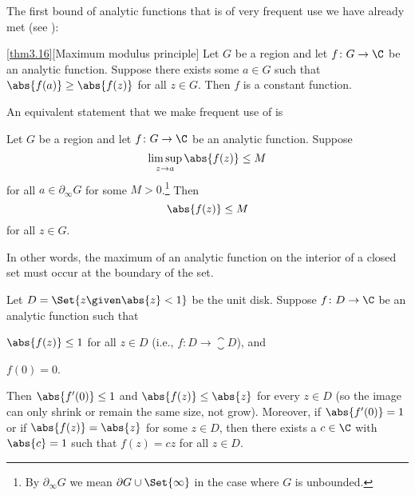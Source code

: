 


The first bound of analytic functions that is of very frequent use we have already met (see ):

\begin{manualtheorem}{\ref{thm3.16}}[Maximum modulus principle]\label{thm6.1}
	Let $G$ be a region and let $f \colon G \to \C$ be an analytic function.
	Suppose there exists some $a \in G$ such that $\abs{f(a)} \geq \abs{f(z)}$ for all $z \in G$.
	Then $f$ is a constant function.
\end{manualtheorem}

An equivalent statement that we make frequent use of is
\begin{corollary}\label{cor6.2}
	Let $G$ be a region and let $f \colon G \to \C$ be an analytic function.
	Suppose
	\[
		\limsup_{z \to a} \abs{f(z)} \leq M
	\]
	for all $a \in \partial_\infty G$ for some $M > 0$.\footnote{By $\partial_\infty G$ we mean $\partial G \cup \Set{\infty}$ in the case where $G$ is unbounded.}
	Then
	\[
		\abs{f(z)} \leq M
	\]
	for all $z \in G$.
\end{corollary}
In other words, the maximum of an analytic function on the interior of a closed set must occur at the boundary of the set.


\begin{theorem}\label{thm6.2}
	Let $D = \Set{z \given \abs{z} < 1}$ be the unit disk.
	Suppose $f \colon D \to \C$ be an analytic function such that
	\begin{items}
		\item $\abs{f(z)} \leq 1$ for all $z \in D$ (i.e., $f \colon D \to \closure{D}$), and
		\item $f(0) = 0$.
	\end{items}
	Then $\abs{f'(0)} \leq 1$ and $\abs{f(z)} \leq \abs{z}$ for every $z \in D$ (so the image can only shrink or remain the same size, not grow).
	Moreover, if $\abs{f'(0)} = 1$ or if $\abs{f(z)} = \abs{z}$ for some $z \in D$, then there exists a $c \in \C$ with $\abs{c} = 1$ such that $f(z) = c z$ for all $z \in D$.
\end{theorem}

